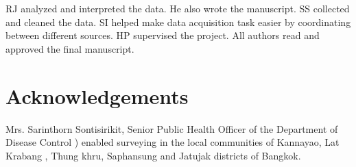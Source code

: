 \documentclass{bmcart}
\begin{document}
\begin{backmatter}
RJ analyzed and interpreted the data. He also wrote the manuscript. SS collected and cleaned the data. SI helped make data acquisition task easier by coordinating between different sources. HP supervised the project. All authors read and approved the final manuscript. 
    
      
\section*{Acknowledgements}
Mrs. Sarinthorn Sontisirikit, Senior Public Health Officer of the Department of Disease Control ) enabled surveying in the local communities of Kannayao, Lat Krabang , Thung khru, Saphansung and Jatujak districts of Bangkok.
  

\clearpage











\end{backmatter}
\end{document}
